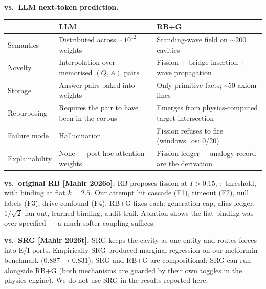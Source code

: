 \documentclass[
  11pt,
  a4paper,
]{article}
\begin{document}
\textbf{vs.~LLM next-token prediction.}

\begin{longtable}[]{@{}
  >{\raggedright\arraybackslash}p{}
  >{\raggedright\arraybackslash}p{}
  >{\raggedright\arraybackslash}p{}@{}}
\toprule\noalign{}
\begin{minipage}[b]{\linewidth}\raggedright
\end{minipage} & \begin{minipage}[b]{\linewidth}\raggedright
LLM
\end{minipage} & \begin{minipage}[b]{\linewidth}\raggedright
RB+G
\end{minipage} \\
\midrule\noalign{}
\endhead
\bottomrule\noalign{}
\endlastfoot
Semantics & Distributed across \(\sim 10^{12}\) weights & Standing-wave
field on \(\sim 200\) cavities \\
Novelty & Interpolation over memorised \((Q, A)\) pairs & Fission +
bridge insertion + wave propagation \\
Storage & Answer pairs baked into weights & Only primitive facts;
\textasciitilde50 axiom lines \\
Repurposing & Requires the pair to have been in the corpus & Emerges
from physics-computed target intersection \\
Failure mode & Hallucination & Fission refuses to fire (windows\_os:
0/20) \\
Explainability & None --- post-hoc attention weights & Fission ledger +
analogy record are the derivation \\
\end{longtable}

\textbf{vs.~original RB {[}Mahir 2026o{]}.} RB proposes fission at
\(I > 0.15\), \(\tau\) threshold, with binding at fiat \(k = 2.5\). Our
attempt hit cascade (F1), timeout (F2), null labels (F3), drive confound
(F4). RB+G fixes each: generation cap, alias ledger, \(1/\sqrt{2}\)
fan-out, learned binding, audit trail. Ablation shows the fiat binding
was over-specified --- a much softer coupling suffices.

\textbf{vs.~SRG {[}Mahir 2026t{]}.} SRG keeps the cavity as one entity
and routes forces into E/I ports. Empirically SRG produced marginal
regression on our metformin benchmark (0.887 → 0.831). SRG and RB+G are
compositional: SRG can run alongside RB+G (both mechanisms are guarded
by their own toggles in the physics engine). We do not use SRG in the
results reported here.
\end{document}
